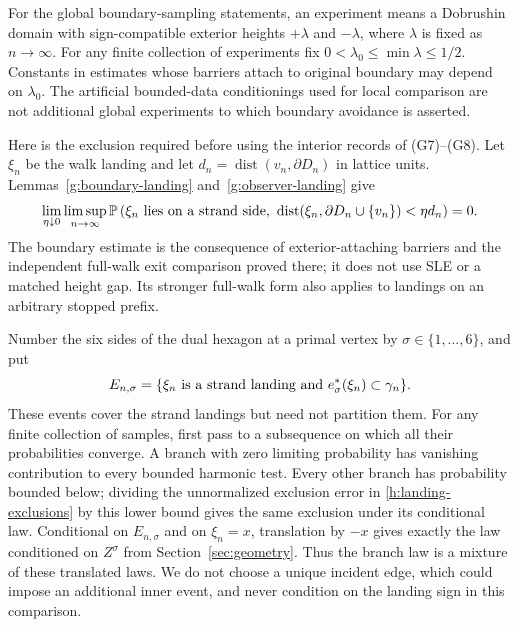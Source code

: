 For the global boundary-sampling statements, an experiment means a
Dobrushin domain with sign-compatible exterior heights
$+\lambda$ and $-\lambda$, where $\lambda$ is fixed as $n\to\infty$.
For any finite collection of experiments fix
$0<\lambda_0\le\min\lambda\le1/2$. Constants in estimates whose
barriers attach to original boundary may depend on $\lambda_0$.
The artificial bounded-data conditionings used for local comparison
are not additional global experiments to which boundary avoidance
is asserted.

Here is the exclusion required before using the interior records of
(G7)--(G8). Let $\xi_n$ be the walk landing and let
$d_n=\operatorname{dist}(v_n,\partial D_n)$ in lattice units.
Lemmas~\ref{g:boundary-landing} and~\ref{g:observer-landing} give
\begin{equation}\label{h:landing-exclusions}
 \lim_{\eta\downarrow0}\limsup_{n\to\infty}
 \mathbb P\left(\xi_n\hbox{ lies on a strand side},\
   \operatorname{dist}(\xi_n,\partial D_n\cup\{v_n\})<\eta d_n
       \right)=0.
\end{equation}
The boundary estimate is the consequence of exterior-attaching barriers
and the independent full-walk exit comparison proved there; it does
not use SLE or a matched height gap. Its stronger full-walk form
also applies to landings on an arbitrary stopped prefix.

Number the six sides of the dual hexagon at a primal vertex by
$\sigma\in\{1,\ldots,6\}$, and put
\[
 E_{n,\sigma}
 =\{\xi_n\hbox{ is a strand landing and }
                 e_\sigma^*(\xi_n)\subset\gamma_n\}.
\]
These events cover the strand landings but need not partition them.
For any finite collection of samples, first pass to a subsequence on
which all their probabilities converge. A branch with zero limiting
probability has vanishing contribution to every bounded harmonic test.
Every other branch has probability bounded below; dividing the
unnormalized exclusion error in \eqref{h:landing-exclusions} by this
lower bound gives the same exclusion under its conditional law.
Conditional on $E_{n,\sigma}$ and on $\xi_n=x$, translation by $-x$
gives exactly the law conditioned on $Z^\sigma$ from
Section~\ref{sec:geometry}. Thus the branch law is a mixture of these
translated laws. We do not choose a unique incident edge, which could
impose an additional inner event, and never condition on the landing
sign in this comparison.

